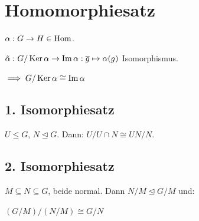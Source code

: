 \section*{Homomorphiesatz}
$\alpha: G \to H \in \operatorname{Hom}$.

$\tilde{\alpha}: G/\operatorname{Ker}\alpha \to \operatorname{Im}\alpha: \overline g \mapsto \alpha(g)$ Isomorphismus.

$\implies G/\operatorname{Ker}\alpha \cong \operatorname{Im}\alpha$

\subsection*{1. Isomorphiesatz}
$U \le G$, $N \trianglelefteq G$. Dann: $U/U \cap N \cong UN/N$.

\subsection*{2. Isomorphiesatz}
$M \subseteq N \subseteq G$, beide normal. Dann $N/M \trianglelefteq G/M$ und:

$(G/M)/(N/M) \cong G/N$
